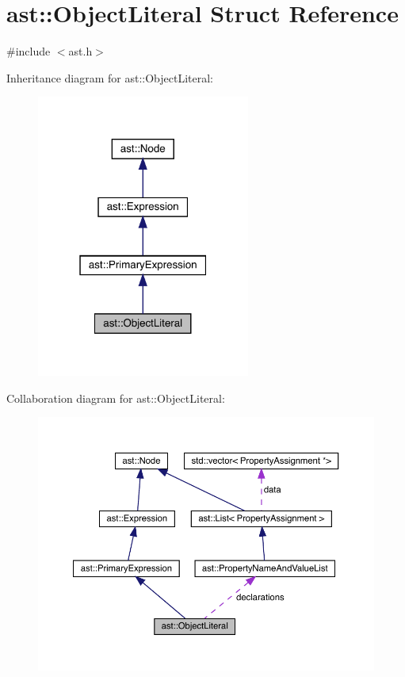 \hypertarget{structast_1_1_object_literal}{}\section{ast\+:\+:Object\+Literal Struct Reference}
\label{structast_1_1_object_literal}


{\ttfamily \#include $<$ast.\+h$>$}



Inheritance diagram for ast\+:\+:Object\+Literal\+:\nopagebreak
\begin{figure}[H]
\begin{center}
\leavevmode
\includegraphics[width=199pt]{structast_1_1_object_literal__inherit__graph}
\end{center}
\end{figure}


Collaboration diagram for ast\+:\+:Object\+Literal\+:\nopagebreak
\begin{figure}[H]
\begin{center}
\leavevmode
\includegraphics[width=350pt]{structast_1_1_object_literal__coll__graph}
\end{center}
\end{figure}
